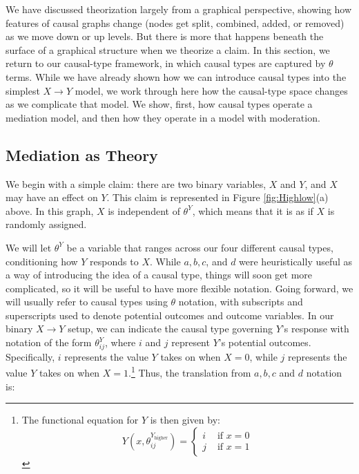 \documentclass[12pt,]{book}
\let\rmarkdownfootnote\footnote%
\def\footnote{\protect\rmarkdownfootnote}
\begin{document}
We have discussed theorization largely from a graphical perspective, showing how features of causal graphs change (nodes get split, combined, added, or removed) as we move down or up levels. But there is more that happens beneath the surface of a graphical structure when we theorize a claim. In this section, we return to our causal-type framework, in which causal types are captured by \(\theta\) terms. While we have already shown how we can introduce causal types into the simplest \(X \rightarrow Y\) model, we work through here how the causal-type space changes as we complicate that model. We show, first, how causal types operate a mediation model, and then how they operate in a model with moderation.

\hypertarget{medtheory}{%
\subsection{Mediation as Theory}\label{medtheory}}

We begin with a simple claim: there are two binary variables, \(X\) and \(Y\), and \(X\) may have an effect on \(Y\). This claim is represented in Figure \ref{fig:Highlow}(a) above. In this graph, \(X\) is independent of \(\theta^Y\), which means that it is as if \(X\) is randomly assigned.

We will let \(\theta^Y\) be a variable that ranges across our four different causal types, conditioning how \(Y\) responds to \(X\). While \(a, b, c\), and \(d\) were heuristically useful as a way of introducing the idea of a causal type, things will soon get more complicated, so it will be useful to have more flexible notation. Going forward, we will usually refer to causal types using \(\theta\) notation, with subscripts and superscripts used to denote potential outcomes and outcome variables. In our binary \(X \rightarrow Y\) setup, we can indicate the causal type governing \(Y\)'s response with notation of the form \(\theta^Y_{ij}\), where \(i\) and \(j\) represent \(Y\)'s potential outcomes. Specifically, \(i\) represents the value \(Y\) takes on when \(X=0\), while \(j\) represents the value \(Y\) takes on when \(X=1\).\footnote{The functional equation for \(Y\) is then given by:
  \[Y(x, \theta_{ij}^{Y_\text{higher}}) = \left\{ \begin{array}{cc}  
  i & \text{ if } x=0 \\ j & \text{ if } x=1 \end{array}  \right.\]} Thus, the translation from \(a, b, c\) and \(d\) notation is:
\end{document}
